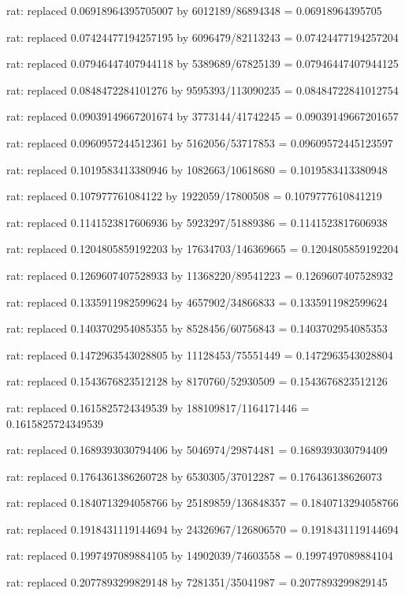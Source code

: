 \documentclass[a4paper,10pt]{article}
\begin{document}
\begin{eulernotebook}
\begin{eulercomment}
\begin{eulercomment}
\begin{eulercomment}
\begin{eulercomment}
\begin{eulercomment}
\begin{eulercomment}
\begin{eulercomment}
\begin{eulercomment}
\begin{eulercomment}
\begin{eulercomment}
\begin{eulercomment}
\begin{eulercomment}
\begin{eulercomment}
\begin{eulercomment}
\begin{eulercomment}
\begin{eulercomment}
\begin{euleroutput}
  rat: replaced 0.06918964395705007 by 6012189/86894348 = 0.06918964395705
  
  rat: replaced 0.07424477194257195 by 6096479/82113243 = 0.07424477194257204
  
  rat: replaced 0.07946447407944118 by 5389689/67825139 = 0.07946447407944125
  
  rat: replaced 0.0848472284101276 by 9595393/113090235 = 0.08484722841012754
  
  rat: replaced 0.09039149667201674 by 3773144/41742245 = 0.09039149667201657
  
  rat: replaced 0.0960957244512361 by 5162056/53717853 = 0.09609572445123597
  
  rat: replaced 0.1019583413380946 by 1082663/10618680 = 0.1019583413380948
  
  rat: replaced 0.107977761084122 by 1922059/17800508 = 0.1079777610841219
  
  rat: replaced 0.1141523817606936 by 5923297/51889386 = 0.1141523817606938
  
  rat: replaced 0.1204805859192203 by 17634703/146369665 = 0.1204805859192204
  
  rat: replaced 0.1269607407528933 by 11368220/89541223 = 0.1269607407528932
  
  rat: replaced 0.1335911982599624 by 4657902/34866833 = 0.1335911982599624
  
  rat: replaced 0.1403702954085355 by 8528456/60756843 = 0.1403702954085353
  
  rat: replaced 0.1472963543028805 by 11128453/75551449 = 0.1472963543028804
  
  rat: replaced 0.1543676823512128 by 8170760/52930509 = 0.1543676823512126
  
  rat: replaced 0.1615825724349539 by 188109817/1164171446 = 0.1615825724349539
  
  rat: replaced 0.1689393030794406 by 5046974/29874481 = 0.1689393030794409
  
  rat: replaced 0.1764361386260728 by 6530305/37012287 = 0.176436138626073
  
  rat: replaced 0.1840713294058766 by 25189859/136848357 = 0.1840713294058766
  
  rat: replaced 0.1918431119144694 by 24326967/126806570 = 0.1918431119144694
  
  rat: replaced 0.1997497089884105 by 14902039/74603558 = 0.1997497089884104
  
  rat: replaced 0.2077893299829148 by 7281351/35041987 = 0.2077893299829145
  

\end{euleroutput}
\end{eulercomment}
\end{eulercomment}
\end{eulercomment}
\end{eulercomment}
\end{eulercomment}
\end{eulercomment}
\end{eulercomment}
\end{eulercomment}
\end{eulercomment}
\end{eulercomment}
\end{eulercomment}
\end{eulercomment}
\end{eulercomment}
\end{eulercomment}
\end{eulercomment}
\end{eulercomment}
\end{eulernotebook}
\end{document}
